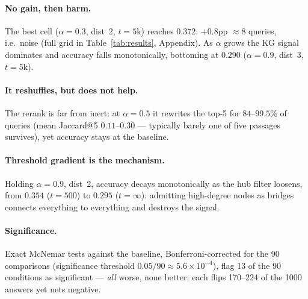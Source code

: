 \documentclass{article}
\begin{document}
\paragraph*{No gain, then harm.} The best cell ($\alpha{=}0.3$, dist~2, $t{=}5\text{k}$) reaches $0.372$: $+0.8$pp $\approx 8$ queries, i.e.\ noise (full grid in Table~\ref{tab:results}, Appendix). As $\alpha$ grows the KG signal dominates and accuracy falls monotonically, bottoming at $0.290$ ($\alpha{=}0.9$, dist~3, $t{=}5\text{k}$).

\paragraph*{It reshuffles, but does not help.} The rerank is far from inert: at $\alpha{=}0.5$ it rewrites the top-5 for $84$--$99.5\%$ of queries (mean Jaccard@5 $0.11$--$0.30$ --- typically barely one of five passages survives), yet accuracy stays at the baseline.

\paragraph*{Threshold gradient is the mechanism.} Holding $\alpha{=}0.9$, dist~2, accuracy decays monotonically as the hub filter loosens, from $0.354$ ($t{=}500$) to $0.295$ ($t{=}\infty$): admitting high-degree nodes as bridges connects everything to everything and destroys the signal.

\paragraph*{Significance.} Exact McNemar tests against the baseline, Bonferroni-corrected for the 90 comparisons (significance threshold $0.05/90\approx5.6\times10^{-4}$), flag 13 of the 90 conditions as significant --- \emph{all} worse, none better; each flips 170--224 of the 1000 answers yet nets negative.

\end{document}
